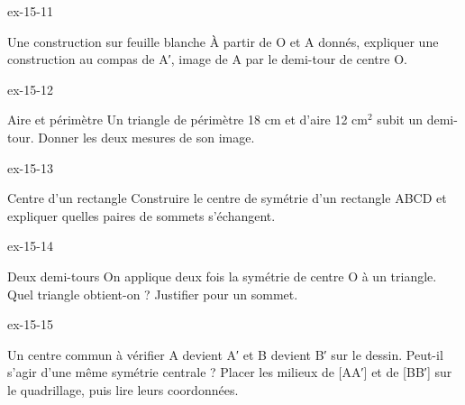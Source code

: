 \begin{blocLivre}{ex-15-11}\begin{exercice}[3]{Une construction sur feuille blanche}
À partir de O et A donnés, expliquer une construction au compas de A′, image de A par le demi-tour de centre O.
\label{fig-ex-15-11}
\end{exercice}\end{blocLivre}
\begin{blocLivre}{ex-15-12}\begin{exercice}[3]{Aire et périmètre}
Un triangle de périmètre 18 cm et d’aire 12 cm$^2$ subit un demi-tour. Donner les deux mesures de son image.
\label{fig-ex-15-12}
\end{exercice}\end{blocLivre}
\begin{blocLivre}{ex-15-13}\begin{exercice}[3]{Centre d’un rectangle}
Construire le centre de symétrie d’un rectangle ABCD et expliquer quelles paires de sommets s’échangent.
\label{fig-ex-15-13}
\end{exercice}\end{blocLivre}
\begin{blocLivre}{ex-15-14}\begin{exercice}[3]{Deux demi-tours}
On applique deux fois la symétrie de centre O à un triangle. Quel triangle obtient-on ? Justifier pour un sommet.
\label{fig-ex-15-14}
\end{exercice}\end{blocLivre}
\begin{blocLivre}{ex-15-15}\begin{exercice}[3]{Un centre commun à vérifier}
A devient A′ et B devient B′ sur le dessin. Peut-il s’agir d’une même symétrie centrale ? Placer les milieux de [AA′] et de [BB′] sur le quadrillage, puis lire leurs coordonnées.
\label{fig-ex-15-15}
\end{exercice}\end{blocLivre}

\clearpage
